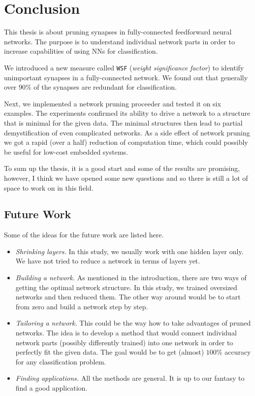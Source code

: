 \chapter{Conclusion} \label{chap:conclusion}
This thesis is about pruning synapses in fully-connected feedforward neural networks. The purpose is to understand individual network parts in order to increase capabilities of using NNs for classification.

We introduced a new measure called \texttt{WSF} (\textit{weight significance factor}) to identify unimportant synapses in a fully-connected network. We found out that generally over $ 90\% $ of the synapses are redundant for classification.

Next, we implemented a network pruning proceeder and tested it on six examples. The experiments confirmed its ability to drive a network to a structure that is minimal for the given data. The minimal structures then lead to partial demystification of even complicated networks. As a side effect of network pruning we got a rapid (over a half) reduction of computation time, which could possibly be useful for low-cost embedded systems.

To sum up the thesis, it is a good start and some of the results are promising, however, I think we have opened some new questions and so there is still a lot of space to work on in this field.

\section{Future Work} \label{sec:future_work}
Some of the ideas for the future work are listed here.

\begin{itemize}
\item \textit{Shrinking layers.} In this study, we usually work with one hidden layer only. We have not tried to reduce a network in terms of layers yet.
\item \textit{Building a network.} As mentioned in the introduction, there are two ways of getting the optimal network structure. In this study, we trained oversized networks and then reduced them. The other way around would be to start from zero and build a network step by step.
\item \textit{Tailoring a network.} This could be the way how to take advantages of pruned networks. The idea is to develop a method that would connect individual network parts (possibly differently trained) into one network in order to perfectly fit the given data. The goal would be to get (almost) $ 100\% $ accuracy for any classification problem.
\item \textit{Finding applications.} All the methods are general. It is up to our fantasy to find a good application.
\end{itemize}